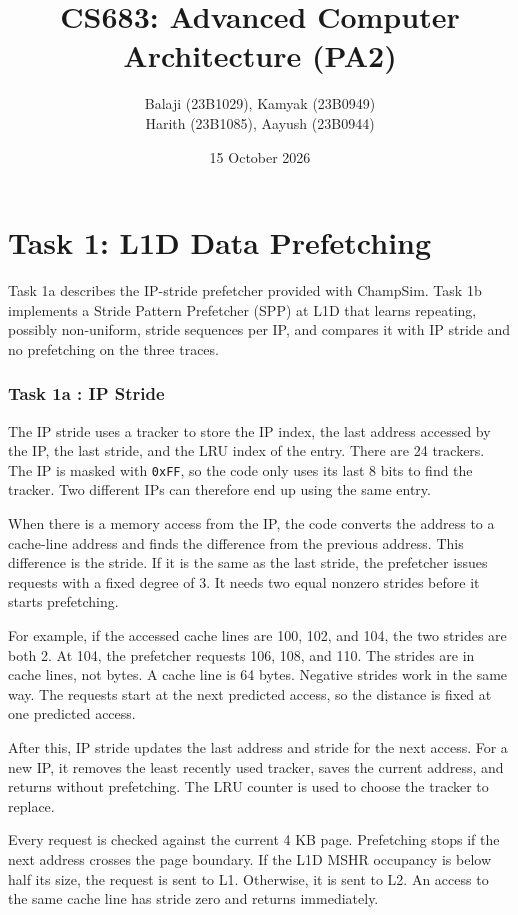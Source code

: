 \documentclass[11pt,a4paper]{article}
\title{\textbf{CS683: Advanced Computer Architecture (PA2)}}
\author{Balaji (23B1029), Kamyak (23B0949)\\
Harith (23B1085), Aayush (23B0944)}
\date{15 October 2026}
\begin{document}
\maketitle

\tableofcontents

\clearpage
\part{Task 1: L1D Data Prefetching}

 Task 1a describes the IP-stride prefetcher
provided with ChampSim. Task 1b implements a Stride Pattern Prefetcher
(SPP) at L1D that learns repeating, possibly non-uniform, stride
sequences per IP, and compares it with IP stride and no prefetching on
the three traces.


\section{Task 1a : IP Stride}

The IP stride uses a tracker to store the IP index, the last address
accessed by the IP, the last stride, and the LRU index of the entry.
There are 24 trackers. The IP is masked with \texttt{0xFF}, so the code
only uses its last 8 bits to find the tracker. Two different IPs can
therefore end up using the same entry.

When there is a memory access from the IP, the code converts the address
to a cache-line address and finds the difference from the previous
address. This difference is the stride. If it is the same as the last
stride, the prefetcher issues requests with a fixed degree of 3.
It needs two equal nonzero strides before it starts prefetching.

For example, if the accessed cache lines are 100, 102, and 104, the two
strides are both 2. At 104, the prefetcher requests 106, 108, and 110.
The strides are in cache lines, not bytes. A cache line is 64 bytes.
Negative strides work in the same way. The requests start at the next
predicted access, so the distance is fixed at one predicted access.

After this, IP stride updates the last address and stride for the next
access. For a new IP, it removes the least recently used tracker, saves
the current address, and returns without prefetching. The LRU counter
is used to choose the tracker to replace.

Every request is checked against the current 4 KB page. Prefetching
stops if the next address crosses the page boundary. If the L1D MSHR
occupancy is below half its size, the request is sent to L1. Otherwise,
it is sent to L2. An access to the same cache line has stride zero and
returns immediately.
\end{document}
